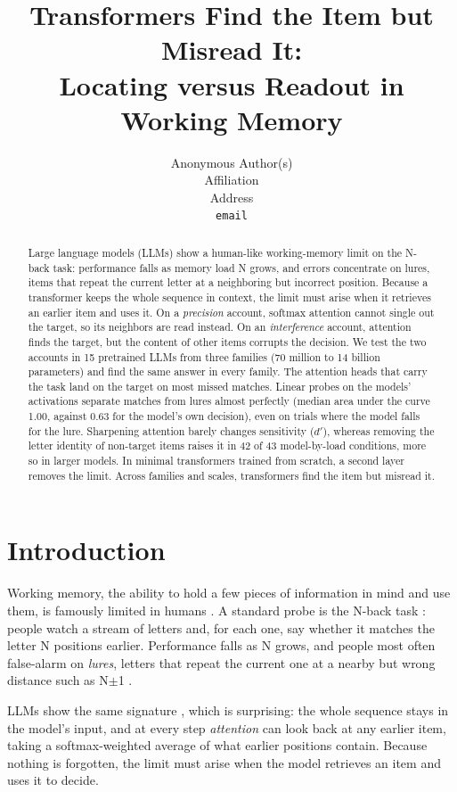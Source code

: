 \documentclass{article}
\title{Transformers Find the Item but Misread It:\\Locating versus Readout in Working Memory}
\author{%
  Anonymous Author(s) \\
  Affiliation \\
  Address \\
  \texttt{email} \\
}
\newcommand{\dprime}{$d'$}
\begin{document}
\maketitle

\begin{abstract}
Large language models (LLMs) show a human-like working-memory limit on the N-back task: performance falls as memory load N grows, and errors concentrate on lures, items that repeat the current letter at a neighboring but incorrect position. Because a transformer keeps the whole sequence in context, the limit must arise when it retrieves an earlier item and uses it. On a \emph{precision} account, softmax attention cannot single out the target, so its neighbors are read instead. On an \emph{interference} account, attention finds the target, but the content of other items corrupts the decision. We test the two accounts in 15 pretrained LLMs from three families (70 million to 14 billion parameters) and find the same answer in every family. The attention heads that carry the task land on the target on most missed matches. Linear probes on the models' activations separate matches from lures almost perfectly (median area under the curve 1.00, against 0.63 for the model's own decision), even on trials where the model falls for the lure. Sharpening attention barely changes sensitivity (\dprime{}), whereas removing the letter identity of non-target items raises it in 42 of 43 model-by-load conditions, more so in larger models. In minimal transformers trained from scratch, a second layer removes the limit. Across families and scales, transformers find the item but misread it.
\end{abstract}

\section{Introduction}
\label{sec:intro}

Working memory, the ability to hold a few pieces of information in mind and use them, is famously limited in humans \citep{cowan2001magical,ma2014changing}. A standard probe is the N-back task \citep{kirchner1958age}: people watch a stream of letters and, for each one, say whether it matches the letter N positions earlier. Performance falls as N grows, and people most often false-alarm on \emph{lures}, letters that repeat the current one at a nearby but wrong distance such as N$\pm$1 \citep{kane2007nback}.

LLMs show the same signature \citep{gong2024chatgpt,hu2025nback,xiong2026superposition}, which is surprising: the whole sequence stays in the model's input, and at every step \emph{attention} \citep{vaswani2017attention} can look back at any earlier item, taking a softmax-weighted average of what earlier positions contain. Because nothing is forgotten, the limit must arise when the model retrieves an item and uses it to decide.
\end{document}
